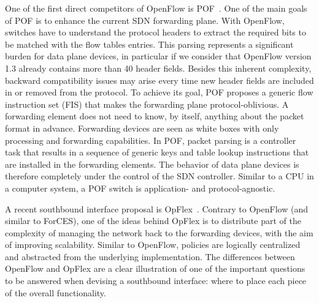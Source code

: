One of the first direct competitors of OpenFlow is POF~\cite{song2013,song2013-1}.
One of the main goals of POF is to enhance the current SDN forwarding plane.
With OpenFlow, switches have to understand the protocol headers to extract the required bits to be matched with the flow tables entries.
This parsing represents a significant burden for data plane devices, in particular if we consider that OpenFlow version 1.3 already contains more  than 40 header fields. 
Besides this inherent complexity, backward compatibility issues may arise every time new header fields are included in or removed from the protocol.
To achieve its goal, POF proposes a generic flow  instruction set (FIS) that makes the forwarding plane protocol-oblivious.
A forwarding element does not need to know, by itself, anything about the packet format in advance.
Forwarding devices are seen as white boxes with only processing and forwarding  capabilities. 
In POF, packet parsing is a controller task that results in a sequence of generic keys and table lookup instructions that are installed in the forwarding elements.
The behavior of data plane devices is therefore completely under the control of the SDN controller.
Similar to a CPU in a computer system, a POF switch is application- and protocol-agnostic. 

A recent southbound interface proposal is OpFlex~\cite{smith2014}.
Contrary to OpenFlow (and similar to ForCES), one of the ideas behind OpFlex is to distribute part of the 
complexity of managing the network back to the forwarding devices, with the aim of improving scalability.
Similar to OpenFlow, policies are logically centralized and abstracted from the underlying implementation.
The differences between OpenFlow and OpFlex are a clear illustration of one of the important questions to be answered when devising a southbound interface: where to place each piece of the overall functionality. 


